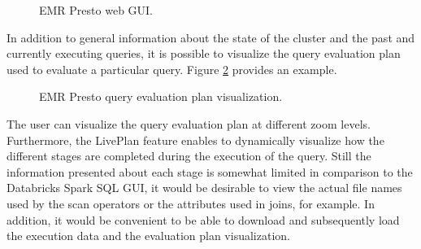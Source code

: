 \begin{figure}
   \begin{center}
   \end{center}
   \caption{EMR Presto web GUI.}
   \label{fig:prestoGUI}
\end{figure}

In addition to general information about the state of the cluster and the past and currently executing queries, it is possible to visualize the query evaluation plan used to evaluate a particular query. Figure \ref{fig:prestoLivePlan} provides an example.

\begin{figure}
   \begin{center}
   \end{center}
   \caption{EMR Presto query evaluation plan visualization.}
   \label{fig:prestoLivePlan}
\end{figure}

The user can visualize the query evaluation plan at different zoom levels. Furthermore, the LivePlan feature enables to dynamically visualize how the different stages are completed during the execution of the query. Still the information presented about each stage is somewhat limited in comparison to the Databricks Spark SQL GUI, it would be desirable to view the actual file names used by the scan operators or the attributes used in joins, for example. In addition, it would be convenient to be able to download and subsequently load the execution data and the evaluation plan visualization.

